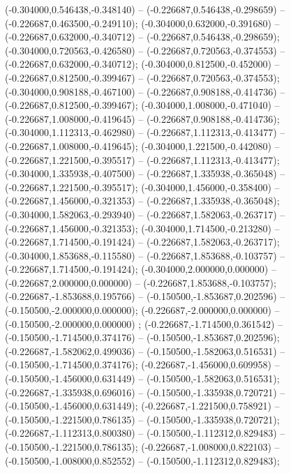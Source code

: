  (-0.304000,0.546438,-0.348140) -- (-0.226687,0.546438,-0.298659) -- (-0.226687,0.463500,-0.249110);
 (-0.304000,0.632000,-0.391680) -- (-0.226687,0.632000,-0.340712) -- (-0.226687,0.546438,-0.298659);
 (-0.304000,0.720563,-0.426580) -- (-0.226687,0.720563,-0.374553) -- (-0.226687,0.632000,-0.340712);
 (-0.304000,0.812500,-0.452000) -- (-0.226687,0.812500,-0.399467) -- (-0.226687,0.720563,-0.374553);
 (-0.304000,0.908188,-0.467100) -- (-0.226687,0.908188,-0.414736) -- (-0.226687,0.812500,-0.399467);
 (-0.304000,1.008000,-0.471040) -- (-0.226687,1.008000,-0.419645) -- (-0.226687,0.908188,-0.414736);
 (-0.304000,1.112313,-0.462980) -- (-0.226687,1.112313,-0.413477) -- (-0.226687,1.008000,-0.419645);
 (-0.304000,1.221500,-0.442080) -- (-0.226687,1.221500,-0.395517) -- (-0.226687,1.112313,-0.413477);
 (-0.304000,1.335938,-0.407500) -- (-0.226687,1.335938,-0.365048) -- (-0.226687,1.221500,-0.395517);
 (-0.304000,1.456000,-0.358400) -- (-0.226687,1.456000,-0.321353) -- (-0.226687,1.335938,-0.365048);
 (-0.304000,1.582063,-0.293940) -- (-0.226687,1.582063,-0.263717) -- (-0.226687,1.456000,-0.321353);
 (-0.304000,1.714500,-0.213280) -- (-0.226687,1.714500,-0.191424) -- (-0.226687,1.582063,-0.263717);
 (-0.304000,1.853688,-0.115580) -- (-0.226687,1.853688,-0.103757) -- (-0.226687,1.714500,-0.191424);
 (-0.304000,2.000000,0.000000) -- (-0.226687,2.000000,0.000000) -- (-0.226687,1.853688,-0.103757);
 (-0.226687,-1.853688,0.195766) -- (-0.150500,-1.853687,0.202596) -- (-0.150500,-2.000000,0.000000);
 (-0.226687,-2.000000,0.000000) -- (-0.150500,-2.000000,0.000000) ;
 (-0.226687,-1.714500,0.361542) -- (-0.150500,-1.714500,0.374176) -- (-0.150500,-1.853687,0.202596);
 (-0.226687,-1.582062,0.499036) -- (-0.150500,-1.582063,0.516531) -- (-0.150500,-1.714500,0.374176);
 (-0.226687,-1.456000,0.609958) -- (-0.150500,-1.456000,0.631449) -- (-0.150500,-1.582063,0.516531);
 (-0.226687,-1.335938,0.696016) -- (-0.150500,-1.335938,0.720721) -- (-0.150500,-1.456000,0.631449);
 (-0.226687,-1.221500,0.758921) -- (-0.150500,-1.221500,0.786135) -- (-0.150500,-1.335938,0.720721);
 (-0.226687,-1.112313,0.800380) -- (-0.150500,-1.112312,0.829483) -- (-0.150500,-1.221500,0.786135);
 (-0.226687,-1.008000,0.822103) -- (-0.150500,-1.008000,0.852552) -- (-0.150500,-1.112312,0.829483);
